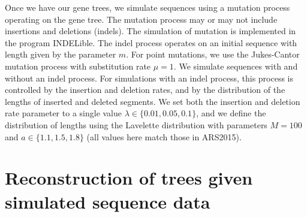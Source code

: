 \documentclass[12pt]{article}
\theoremstyle{definition}
\begin{document}
\begin{center}
\end{center}

Once we have our gene trees, we simulate sequences using a mutation process operating on the gene tree. The mutation process may or may not include insertions and deletions (indels). The simulation of mutation is implemented in the program INDELible. The indel process operates on an initial sequence with length given by the parameter $m$. For point mutations, we use the Jukes-Cantor mutation process with substitution rate $\mu = 1$. We simulate sequences with and without an indel process. For simulations with an indel process, this process is controlled by the insertion and deletion rates, and by the distribution of the lengths of inserted and deleted segments. We set both the insertion and deletion rate parameter to a single value $\lambda \in \{0.01,0.05,0.1\}$, and we define the distribution of lengths using the Lavelette distribution with parameters $M=100$ and $a \in \{1.1, 1.5, 1.8\}$ (all values here match those in ARS2015).



\section{Reconstruction of trees given simulated sequence data}
\end{document}
